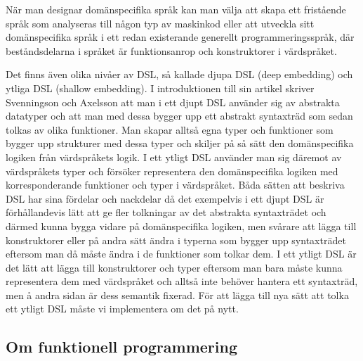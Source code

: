 \documentclass[]{article}
\begin{document}
När man designar domänspecifika språk kan man välja att skapa ett fristående
språk som analyseras till någon typ av maskinkod eller att utveckla sitt
domänspecifika språk i ett redan existerande generellt programmeringsspråk,
där beståndsdelarna i språket är funktionsanrop och konstruktorer i värdspråket.

Det finns även olika nivåer av DSL, så kallade djupa DSL (deep embedding) och
ytliga DSL (shallow embedding). I introduktionen till sin artikel skriver
Svenningson och Axelsson \cite{svenningsson2013combining} att man i ett djupt
DSL använder sig av abstrakta datatyper och att man med dessa bygger upp ett
abstrakt syntaxträd som sedan tolkas av olika funktioner.
Man skapar alltså egna typer och funktioner som bygger upp strukturer med dessa
typer och skiljer på så sätt den domänspecifika logiken från värdspråkets logik.
I ett ytligt DSL använder man sig däremot av värdspråkets typer och försöker
representera den domänspecifika logiken med korresponderande funktioner och
typer i värdspråket.
Båda sätten att beskriva DSL har sina fördelar och nackdelar då det exempelvis
i ett djupt DSL är förhållandevis lätt att ge fler tolkningar av det abstrakta
syntaxträdet och därmed kunna bygga vidare på domänspecifika logiken,
men svårare att lägga till konstruktorer eller på andra sätt ändra i typerna som
bygger upp syntaxträdet eftersom man då måste ändra i de funktioner som tolkar
dem. I ett ytligt DSL är det lätt att lägga till konstruktorer och typer
eftersom man bara måste kunna representera dem med värdspråket och alltså inte
behöver hantera ett syntaxträd, men å andra sidan är dess semantik fixerad.
För att lägga till nya sätt att tolka ett ytligt DSL måste vi implementera
om det på nytt.

\subsection{Om funktionell programmering}
\end{document}

